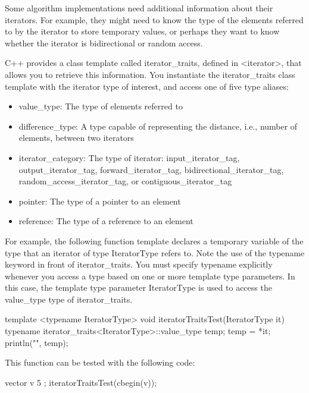 Some algorithm implementations need additional information about their iterators. For example, they might need to know the type of the elements referred to by the iterator to store temporary values, or perhaps they want to know whether the iterator is bidirectional or random access.

C++ provides a class template called iterator\_traits, defined in <iterator>, that allows you to retrieve this information. You instantiate the iterator\_traits class template with the iterator type of interest, and access one of five type aliases:

\begin{itemize}
\item
value\_type: The type of elements referred to

\item
difference\_type: A type capable of representing the distance, i.e., number of elements, between two iterators

\item
iterator\_category: The type of iterator: input\_iterator\_tag, output\_iterator\_tag, forward\_iterator\_tag, bidirectional\_iterator\_tag, random\_access\_iterator\_tag, or contiguous\_iterator\_tag

\item
pointer: The type of a pointer to an element

\item
reference: The type of a reference to an element
\end{itemize}

For example, the following function template declares a temporary variable of the type that an iterator of type IteratorType refers to. Note the use of the typename keyword in front of iterator\_traits. You must specify typename explicitly whenever you access a type based on one or more template type parameters. In this case, the template type parameter IteratorType is used to access the value\_type type of iterator\_traits.

\begin{cpp}
template <typename IteratorType>
void iteratorTraitsTest(IteratorType it)
{
    typename iterator_traits<IteratorType>::value_type temp;
    temp = *it;
    println("{}", temp);
}
\end{cpp}

This function can be tested with the following code:

\begin{cpp}
vector v { 5 };
iteratorTraitsTest(cbegin(v));
\end{cpp}

